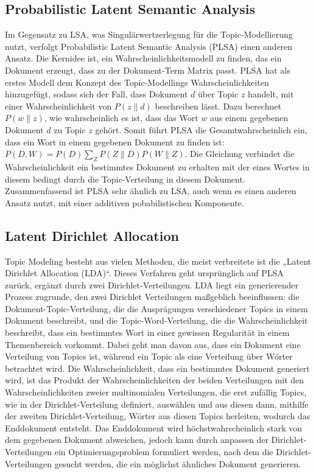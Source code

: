 \documentclass[german,version-2020-11]{uzl-thesis}
\begin{document}
\subsection{Probabilistic Latent Semantic Analysis}
Im Gegensatz zu LSA, was Singulärwertzerlegung für die Topic-Modellierung nutzt, verfolgt Probabilistic Latent Semantic Analysis (PLSA) einen anderen Ansatz. Die Kernidee ist, ein Wahrscheinlichkeitsmodell zu finden, das ein Dokument erzeugt, dass zu der Dokument-Term Matrix passt. PLSA hat als erstes Modell dem Konzept des Topic-Modellings Wahrscheinlichkeiten hinzugefügt, sodass sich der Fall, dass Dokument $d$ über Topic $z$ handelt, mit einer Wahrscheinlichkeit von $P(z\|d)$ beschreiben lässt. Dazu berechnet $P(w\|z)$, wie wahrscheinlich es ist, dass das Wort $w$ aus einem gegebenen Dokument $d$ zu Topic $z$ gehört. Somit führt PLSA die Gesamtwahrscheinlich ein, dass ein Wort in einem gegebenen Dokument zu finden ist: $P(D,W) = P(D) \sum_{Z}{P(Z\|D)P(W\|Z)}$. Die Gleichung verbindet die Wahrscheinlichkeit ein bestimmtes Dokument zu erhalten mit der eines Wortes in diesem bedingt durch die Topic-Verteilung in diesem Dokument. Zusammenfassend ist PLSA sehr ähnlich zu LSA, auch wenn es einen anderen Ansatz nutzt, mit einer additiven pobabilistischen Komponente. 

\subsection{Latent Dirichlet Allocation}
Topic Modeling besteht aus vielen Methoden, die meist verbreitete ist die „Latent Dirichlet Allocation (LDA)“.  Dieses Verfahren geht ursprünglich auf PLSA zurück, ergänzt durch zwei Dirichlet-Verteilungen. LDA liegt ein generierender Prozess zugrunde, den zwei Dirichlet Verteilungen maßgeblich beeinflussen: die Dokument-Topic-Verteilung, die die Ausprägungen verschiedener Topics in einem Dokument beschreibt, und die Topic-Word-Verteilung, die die Wahrscheinlichkeit beschreibt, dass ein bestimmtes Wort in einer gewissen Regularität in einem Themenbereich vorkommt. Dabei geht man davon aus, dass ein Dokument eine Verteilung von Topics ist, während ein Topic als eine Verteilung über Wörter betrachtet wird. 
Die Wahrscheinlichkeit, dass ein bestimmtes Dokument generiert wird, ist das Produkt der Wahrscheinlichkeiten der beiden Verteilungen mit den Wahrscheinlichkeiten zweier multinomialen Verteilungen, die erst zufällig Topics, wie in der Dirichlet-Verteilung definiert, auswählen und aus diesen dann, mithilfe der zweiten Dirichlet-Verteilung, Wörter aus diesen Topics herleiten, wodurch das Enddokument entsteht. Das Enddokument wird höchstwahrscheinlich stark von dem gegebenen Dokument abweichen, jedoch kann durch anpassen der Dirichlet-Verteilungen ein Optimierungsproblem formuliert werden, nach dem die Dirichlet-Verteilungen gesucht werden, die ein möglichst ähnliches Dokument generieren.
\end{document}
